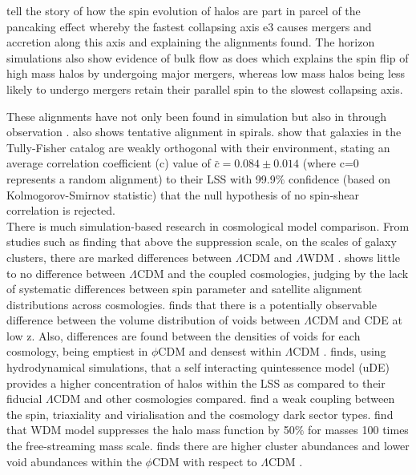 \documentclass[a4paper,fleqn,usenatbib]{mnras}
\def \lcdm{$\Lambda$CDM }
\def \lwdm{$\Lambda$WDM }
\def \qcdm{$\phi$CDM }
\begin{document}
\citet{Bond_96,Codis_12,Pichon_16} tell the story of how the spin evolution of halos are part in parcel of the pancaking effect whereby the fastest collapsing axis e3 causes mergers and accretion along this axis and explaining the alignments found. The horizon simulations \citep{Dubois_14,Welker_14} also show evidence of bulk flow as does \citet{Trowland_13} which explains the spin flip of high mass halos by undergoing major mergers, whereas low mass halos being less likely to undergo mergers retain their parallel spin to the slowest collapsing axis.

These alignments have not only been found in simulation but also in through observation \citep{Jones_10}. \citet{Pen_00} also shows tentative alignment in spirals. 
\citet{Lee_Erdogdu_07} show that galaxies in the Tully-Fisher catalog are weakly orthogonal with their environment, stating an average correlation coefficient (c) value of $\bar{c}=0.084\pm 0.014$ (where c=0 represents a random alignment) to their LSS with 99.9$\%$ confidence (based on Kolmogorov-Smirnov statistic) that the null hypothesis of no spin-shear correlation is rejected.
\\
There is much simulation-based research in cosmological model comparison. From studies such as \citet{Elahi_14} finding that above the suppression scale, on the scales of galaxy clusters, there are marked differences between \lcdm and \lwdm. \citet{Elahi_15} shows little to no difference between \lcdm and the coupled cosmologies, judging by the lack of systematic differences between spin parameter and satellite alignment distributions across cosmologies. \citet{Adermann_18} finds that there is a potentially observable difference between the volume distribution of voids between \lcdm and CDE at low z. Also, differences are found between the densities of voids for each cosmology, being emptiest in \qcdm and densest within \lcdm. \citet{Carlesi_14a} finds, using hydrodynamical simulations, that a self interacting quintessence model (uDE) provides a higher concentration of halos within the LSS as compared to their fiducial \lcdm and other cosmologies compared. \citet{Carlesi_14b} find a weak coupling between the spin, triaxiality and virialisation and the cosmology dark sector types. \citet{Smith_11} find that WDM model suppresses the halo mass function by 50$\%$ for masses 100 times the free-streaming mass scale. \citet{Watts_17} finds there are higher cluster abundances and lower void abundances within the \qcdm with respect to \lcdm. 
\end{document}
